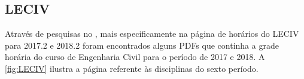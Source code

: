 \subsection{LECIV} \label{ssec:leciv}                         %

Através de pesquisas no , mais especificamente na página de horários do LECIV para 2017.2 e 2018.2 foram encontrados alguns PDFs que continha a grade horária do curso de Engenharia Civil para o período de 2017 e 2018. A \autoref{fig:LECIV} ilustra a página referente às disciplinas do sexto período.

